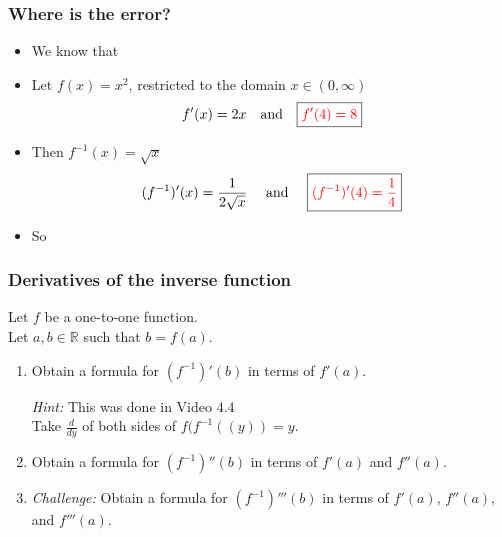 \documentclass[14pt]{beamer}
\begin{document}
	\begin{frame}[t]
		\frametitle{Where is the error?}

		\begin{itemize}
			\item We know that 

			\item Let $\displaystyle f(x) = x^{2}$, restricted to the domain
				$\displaystyle x \in (0, \infty)$
				\[
					f'(x) = 2x \quad \text{and}\quad \boxed{{\color{red} f'(4) = 8}}
				\]

			\item Then $\displaystyle f^{-1}(x) = \sqrt{x}$
				\[
					(f^{-1})'(x) = \frac{1}{2\sqrt{x}}\quad \text{ and }\quad \boxed{{\color{red} (f^{-1})'(4) = \frac{1}{4}}}
				\]

			\item So 
		\end{itemize}
	\end{frame}

	\begin{frame}[t]
		\frametitle{Derivatives of the inverse function}

		Let $f$ be a one-to-one function. \\ Let $a, b \in \mathbb{R}$ such that $b=f
		(a)$.

		\vfill
		\begin{enumerate}
			\item Obtain a formula for $\displaystyle \left(f^{-1}\right)'(b)$ in terms
				of $\displaystyle f'(a)$.
				\vspace{.2cm}

				{\fontsize{13}{13}\selectfont \emph{Hint:} This was done in Video 4.4 \\ Take $\displaystyle \frac{d}{dy}$ of both sides of \quad $\displaystyle f(f^{-1}( (y)) = y$. }

				\vfill

			\item Obtain a formula for $\displaystyle \left(f^{-1}\right)''(b)$ in terms
				of $\displaystyle f'(a)$ and $\displaystyle f''(a)$.

				\vfill

			\item \emph{Challenge:} Obtain a formula for
				$\displaystyle \left(f^{-1}\right)'''(b)$ in terms of
				$\displaystyle f'(a)$, $\displaystyle f''(a)$, and
				$\displaystyle f'''(a)$.
		\end{enumerate}
	\end{frame}
\end{document}
